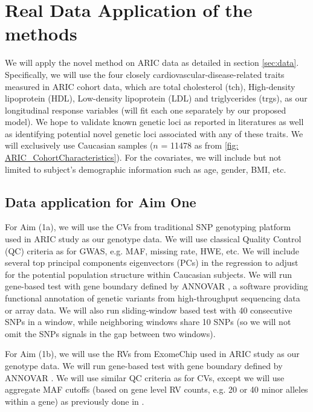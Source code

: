 \documentclass[12pt]{article}
\begin{document}
\section{Real Data Application of the methods}\label{sec:subsub1-3}
\label{sec:Data Application}
We will apply the novel method on ARIC data as detailed in section \ref{sec:data}. Specifically, we will use the four closely cardiovascular-disease-related traits measured in ARIC cohort data, which are total cholesterol (tch), High-density lipoprotein (HDL), Low-density lipoprotein (LDL) and triglycerides (trgs), as our longitudinal response variables (will fit each one separately by our proposed model). We hope to validate known genetic loci as reported in literatures \cite{Teslovich2010,Lange2014,Peloso2014,Consortium2013,Maxwell2013} as well as identifying potential novel genetic loci associated with any of these traits. We will exclusively use Caucasian samples ($n$ = 11478 as from \ref{fig: ARIC_CohortCharacteristics}). For the covariates, we will include but not limited to subject's demographic information such as age, gender, BMI, etc. 

\subsection{Data application for Aim One}
\label{sec:Data Application-aim1}
For Aim (1a), we will use the CVs from traditional SNP genotyping platform used in ARIC study as our genotype data. We will use classical Quality Control (QC) criteria as for GWAS, e.g. MAF, missing rate, HWE, etc. We will include several top principal components eigenvectors (PCs) in the regression to adjust for the potential population structure within Caucasian subjects. We will run gene-based test with gene boundary defined by ANNOVAR \cite{Wang2010a}, a software providing functional annotation of genetic variants from high-throughput sequencing data or array data.  We will also run sliding-window based test with 40 consecutive SNPs in a window, while neighboring windows share 10 SNPs (so we will not omit the SNPs signals in the gap between two windows). 

For Aim (1b), we will use the RVs from ExomeChip used in ARIC study as our genotype data. We will run gene-based test with gene boundary defined by ANNOVAR \cite{Wang2010a}. We will use similar QC criteria as for CVs, except we will use aggregate MAF cutoffs (based on gene level RV counts, e.g. 20 or 40 minor alleles within a gene) as previously done in \cite{Lange2014,Peloso2014}. 
\end{document}
